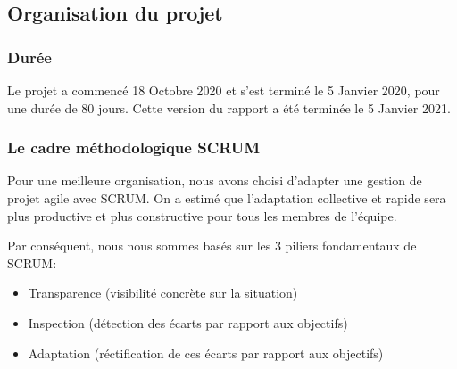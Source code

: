 \documentclass[12pt]{article}
\begin{document}
\subsection{Organisation du projet}
\subsubsection{Durée}
Le projet a commencé 18 Octobre 2020 et s'est terminé le 5 Janvier 2020, pour une durée de 80 jours. Cette version du rapport a été terminée le 5 Janvier 2021.

\subsubsection{Le cadre méthodologique SCRUM}

Pour une meilleure organisation, nous avons choisi d'adapter une gestion de projet agile avec SCRUM. On a estimé que l'adaptation collective et rapide sera plus productive et plus constructive pour tous les membres de l'équipe.

Par conséquent, nous nous sommes basés sur les 3 piliers fondamentaux de SCRUM: 
\begin{itemize}
    \item Transparence (visibilité concrète sur la situation)
    \item Inspection (détection des écarts par rapport aux objectifs)
    \item Adaptation (réctification de ces écarts par rapport aux objectifs)
\end{itemize}
\end{document}

